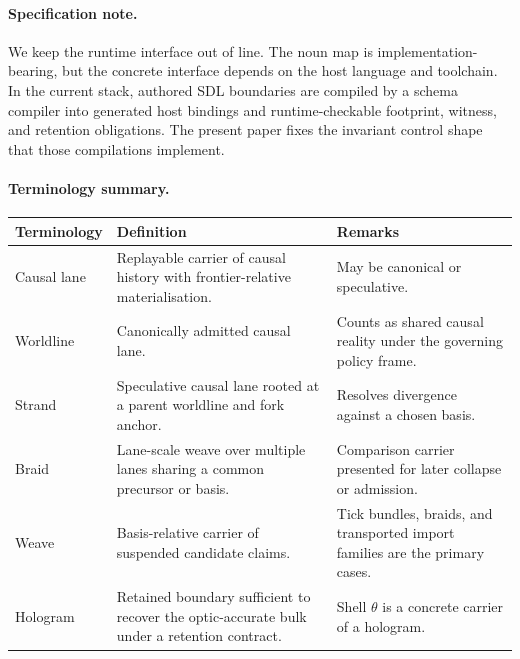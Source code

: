 \documentclass{aion}
\begin{document}
\paragraph{Specification note.}
We keep the runtime interface out of line. The noun map is
implementation-bearing, but the concrete interface depends on the host language
and toolchain. In the current stack, authored SDL boundaries are compiled by
a schema compiler into generated host bindings and runtime-checkable footprint,
witness, and retention obligations. The present paper fixes the invariant
control shape that those compilations implement.

\paragraph{Terminology summary.}
\begin{center}
	\small
	\setlength{\tabcolsep}{4pt}
	\renewcommand{\arraystretch}{1.05}
	\AIONTableStyleOn
	\begin{tabularx}{\textwidth}{@{}>{\raggedright\arraybackslash}p{}X>{\raggedright\arraybackslash}p{}@{}}
		\toprule
		\AIONTableHead
		Terminology & Definition & Remarks \\
		\midrule
		Causal lane & Replayable carrier of causal history with frontier-relative materialisation. & May be canonical or speculative. \\
		Worldline   & Canonically admitted causal lane. & Counts as shared causal reality under the governing policy frame. \\
		Strand      & Speculative causal lane rooted at a parent worldline and fork anchor. & Resolves divergence against a chosen basis. \\
		Braid       & Lane-scale weave over multiple lanes sharing a common precursor or basis. & Comparison carrier presented for later collapse or admission. \\
		Weave       & Basis-relative carrier of suspended candidate claims. & Tick bundles, braids, and transported import families are the primary cases. \\
		Hologram    & Retained boundary sufficient to recover the optic-accurate bulk under a retention contract. & Shell \(\theta\) is a concrete carrier of a hologram. \\
		\bottomrule
	\end{tabularx}
	\AIONTableStyleOff
\end{center}
\end{document}
